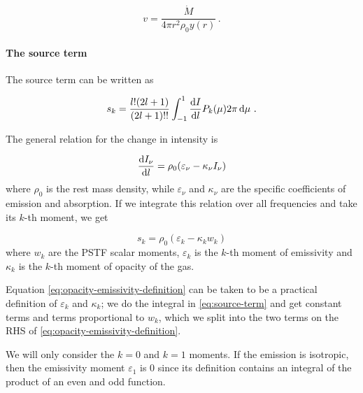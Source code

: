 \documentclass[main.tex]{subfiles}
\begin{document}
\begin{equation}
  v = \frac{\dot M}{4 \pi r^2 \rho_0 y(r)}\,.
\end{equation}

\paragraph{The source term}

The source term can be written \cite[eq. 15]{ThorneFLammmangZytkow:1981feb} as

\begin{equation} \label{eq:source-term}
  s_k = \frac{l! (2l+1)}{(2l+1)!!} \int_{-1}^1 \dv{I}{l} P_k(\mu) 2 \pi \dd{\mu}\,.
\end{equation}


The general relation for the change in intensity is

\begin{equation}
  \dv{I_\nu}{l} = \rho_0 \qty(\varepsilon_\nu - \kappa_\nu I_\nu )
\end{equation}
where \(\rho_0\) is the rest mass density, while \(\varepsilon_\nu\) and \(\kappa_\nu\) are the specific coefficients of emission and absorption. If we integrate this relation over all frequencies and take its \(k\)-th moment, we get

\begin{equation} \label{eq:opacity-emissivity-definition}
  s_k = \rho_0 (\varepsilon_k - \kappa_k w_k)
\end{equation}
where \(w_k\) are the PSTF scalar moments, \(\varepsilon_k\) is the \(k\)-th moment of emissivity and \(\kappa_k\) is the \(k\)-th moment of opacity of the gas.

Equation \eqref{eq:opacity-emissivity-definition} can be taken to be a practical definition of \(\varepsilon_k\) and \(\kappa_k\); we do the integral in \eqref{eq:source-term} and get constant terms and terms proportional to \(w_k\), which we split into the two terms on the RHS of \eqref{eq:opacity-emissivity-definition}.

We will only consider the \(k=0\) and \(k=1\) moments.
If the emission is isotropic, then the emissivity moment \(\varepsilon_1\) is 0 since its definition contains an integral of the product of an even and odd function.
\end{document}
